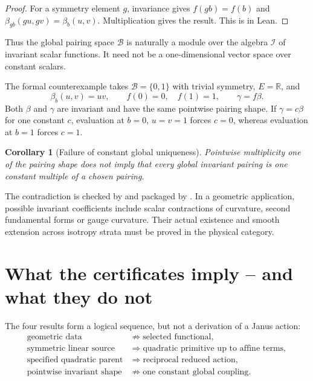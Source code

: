 \documentclass[11pt,a4paper]{article}
\newtheorem{corollary}[theorem]{Corollary}
\theoremstyle{definition}
\theoremstyle{remark}
\newcommand{\R}{\mathbb{R}}
\newcommand{\Inv}{\mathcal{I}}
\newcommand{\Pair}{\mathcal{B}}
\begin{document}
\begin{proof}
For a symmetry element $g$, invariance gives $f(gb)=f(b)$ and
$\beta_{gb}(gu,gv)=\beta_b(u,v)$. Multiplication gives the result. This is
 in Lean.
\end{proof}

Thus the global pairing space $\Pair$ is naturally a module over the algebra
$\Inv$ of invariant scalar functions. It need not be a one-dimensional vector
space over constant scalars.

The formal counterexample takes $\mathcal{B}=\{0,1\}$ with trivial symmetry,
$E=\R$, and
\begin{equation}
  \beta_b(u,v)=uv,
  \qquad
  f(0)=0,\quad f(1)=1,
  \qquad
  \gamma=f\beta.
\end{equation}
Both $\beta$ and $\gamma$ are invariant and have the same pointwise pairing
shape. If $\gamma=c\beta$ for one constant $c$, evaluation at $b=0$, $u=v=1$
forces $c=0$, whereas evaluation at $b=1$ forces $c=1$.

\begin{corollary}[Failure of constant global uniqueness]
Pointwise multiplicity one of the pairing shape does not imply that every
global invariant pairing is one constant multiple of a chosen pairing.
\end{corollary}

The contradiction is checked by
 and packaged by
. In a geometric
application, possible invariant coefficients include scalar contractions of
curvature, second fundamental forms or gauge curvature. Their actual existence
and smooth extension across isotropy strata must be proved in the physical
category.

\section{What the certificates imply -- and what they do not}

The four results form a logical sequence, but not a derivation of a Janus
action:
\begin{equation}
\begin{aligned}
\text{geometric data}
&\not\Rightarrow \text{selected functional},\\
\text{symmetric linear source}
&\Rightarrow \text{quadratic primitive up to affine terms},\\
\text{specified quadratic parent}
&\Rightarrow \text{reciprocal reduced action},\\
\text{pointwise invariant shape}
&\not\Rightarrow \text{one constant global coupling}.
\end{aligned}
\end{equation}
\end{document}
